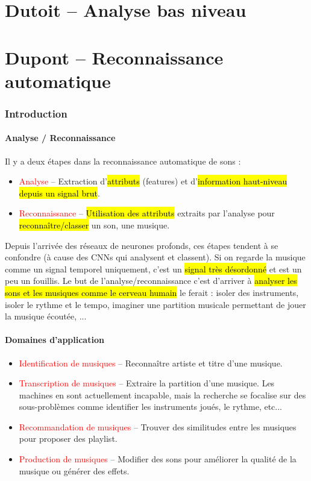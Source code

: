 \documentclass[letterpaper, 12pt]{article}
\newcommand{\alinea}{
\hspace*{0.5cm}}
\newcommand{\red}[1]{
	\textcolor{red}{#1}}
\begin{document}
\part{Dutoit -- Analyse bas niveau}
%
\pagebreak
%
\part{Dupont -- Reconnaissance automatique}
	\section{Introduction}
		\subsection{Analyse / Reconnaissance}
			\alinea Il y a deux étapes dans la reconnaissance automatique de sons : 
			\begin{itemize}
				\setlength\itemsep{0cm}
				\item \red{Analyse} -- Extraction d'\hl{attributs} (features) et d'\hl{information haut-niveau depuis un signal brut}.
				\item \red{Reconnaissance} -- \hl{Utilisation des attributs} extraits par l'analyse pour \hl{reconnaître/classer} un son, 
					une musique.
			\end{itemize}
			\alinea Depuis l'arrivée des réseaux de neurones profonds, ces étapes tendent à se confondre (à cause des CNNs qui analysent
				et classent). Si on regarde la musique comme un signal temporel uniquement, c'est un \hl{signal très désordonné} et est 
				un peu un fouillis. Le but de l'analyse/reconnaissance c'est d'arriver à \hl{analyser les sons et les musiques comme 
				le cerveau humain} le ferait : isoler des instruments, isoler le rythme et le tempo, imaginer une partition musicale
				permettant de jouer la musique écoutée, ...
		\subsection{Domaines d'application}
			\begin{itemize}
				\setlength\itemsep{0cm}
				\item \red{Identification de musiques} -- Reconnaître artiste et titre d'une musique.
				\item \red{Transcription de musiques} -- Extraire la partition d'une musique. Les machines en sont actuellement 
					incapable, mais la recherche se focalise sur des sous-problèmes comme identifier les instruments joués, le rythme, etc...
				\item \red{Recommandation de musiques} -- Trouver des similitudes entre les musiques pour proposer des playlist.
				\item \red{Production de musiques} -- Modifier des sons pour améliorer la qualité de la musique ou générer des effets.
			\end{itemize}
\end{document}
